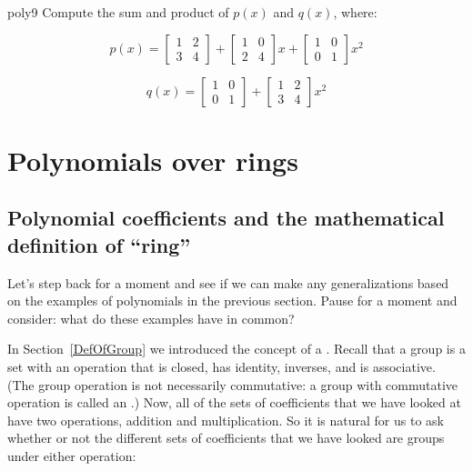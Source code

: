 \begin{exercise}{poly9}
Compute the sum and product of $p(x)$ and $q(x)$, where:

$$p(x)=  \begin{bmatrix} 
1 & 2 \\
3 & 4 
\end{bmatrix}
+\begin{bmatrix} 
1 & 0 \\
2 & 4 
\end{bmatrix}
 x+\begin{bmatrix} 
1 & 0 \\
0 & 1 
\end{bmatrix}
 x^2$$

$$q(x)=  \begin{bmatrix} 
1 & 0 \\
0 & 1 
\end{bmatrix}
+\begin{bmatrix} 
1 & 2 \\
3 & 4 
\end{bmatrix}
 x^2$$
\end{exercise}

\section{Polynomials over  rings}\label{polycoefficients}

\subsection{Polynomial coefficients and the mathematical definition of ``ring''}

Let's step back for a moment and see if we can make any generalizations based on the examples of polynomials in the previous section. Pause for a moment and consider: what do these examples have in common?

In Section~\ref{DefOfGroup} we introduced the concept of a . Recall that a group is a set with an operation that is closed, has identity, inverses, and is associative. (The group operation is not necessarily commutative: a group with commutative operation is called an .) Now, all of the sets of coefficients that we have looked at have two operations, addition and multiplication. So  it is natural for us to ask whether or not the different sets of coefficients that we have looked  are groups under either operation:  


